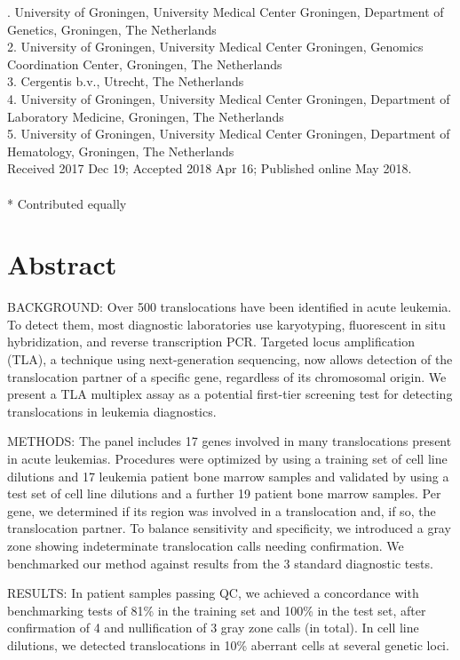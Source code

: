 . University of Groningen, University Medical Center Groningen, Department of Genetics, Groningen, The Netherlands\\
2. University of Groningen, University Medical Center Groningen, Genomics Coordination Center, Groningen, The Netherlands\\
3. Cergentis b.v., Utrecht, The Netherlands \\
4. University of Groningen, University Medical Center Groningen, Department of Laboratory Medicine, Groningen, The Netherlands\\
5. University of Groningen, University Medical Center Groningen, Department of Hematology, Groningen, The Netherlands\\

\noindent
Received 2017 Dec 19; Accepted 2018 Apr 16; Published online May 2018.
\\~\\
* Contributed equally


\section*{Abstract}\label{abstract}
BACKGROUND: Over 500 translocations have been identified in acute leukemia.
To detect them, most diagnostic laboratories use karyotyping, fluorescent in situ hybridization, and reverse transcription PCR. 
Targeted locus amplification (TLA), a technique using next-generation sequencing, now allows detection of the translocation partner of a specific gene, regardless of its chromosomal origin. 
We present a TLA multiplex assay as a potential first-tier screening test for detecting translocations in leukemia diagnostics.

\noindent METHODS: The panel includes 17 genes involved in many translocations present in acute leukemias. 
Procedures were optimized by using a training set of cell line dilutions and 17 leukemia patient bone marrow samples and validated by using a test set of cell line dilutions and a further 19 patient bone marrow samples.
Per gene, we determined if its region was involved in a translocation and, if so, the translocation partner. 
To balance sensitivity and specificity, we introduced a gray zone showing indeterminate translocation calls needing confirmation. 
We benchmarked our method against results from the 3 standard diagnostic tests.

\noindent RESULTS: In patient samples passing QC, we achieved a concordance with benchmarking tests of 81\% in the training set and 100\% in the test set, after confirmation of 4 and nullification of 3 gray zone calls (in total).
In cell line dilutions, we detected translocations in 10\% aberrant cells at several genetic loci.

